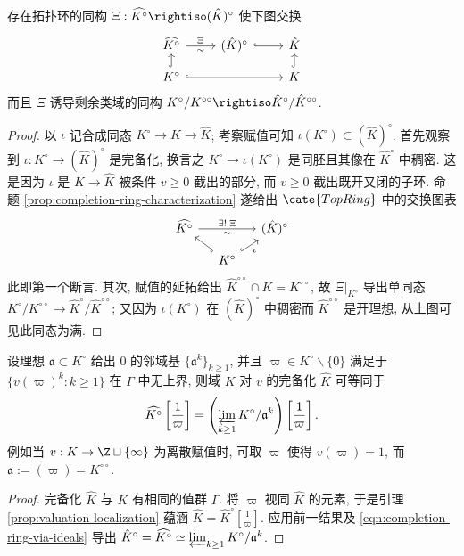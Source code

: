 \begin{proposition}\label{prop:K-circ-completion}
	存在拓扑环的同构 $\Xi: \widehat{K^\circ} \rightiso (\hat{K})^\circ$ 使下图交换
	\[ \begin{tikzcd}[row sep=small]
		\widehat{K^\circ} \arrow[r, "\Xi", "\sim"'] & (\hat{K})^\circ \arrow[hookrightarrow, r] & \hat{K} \\
		K^\circ \arrow[hookrightarrow, u] \arrow[hookrightarrow, rr] & & K \arrow[hookrightarrow, u]
	\end{tikzcd}\]
	而且 $\Xi$ 诱导剩余类域的同构 $K^\circ/K^{\circ\circ} \rightiso \hat{K}^\circ/\hat{K}^{\circ\circ}$.
\end{proposition}
\begin{proof}
	以 $\iota$ 记合成同态 $K^\circ \to K \to \hat{K}$; 考察赋值可知 $\iota(K^\circ) \subset (\hat{K})^\circ$. 首先观察到 $\iota: K^\circ \to (\hat{K})^\circ$ 是完备化, 换言之 $K^\circ \to \iota(K^\circ)$ 是同胚且其像在 $\hat{K}^\circ$ 中稠密. 这是因为 $\iota$ 是 $K \to \hat{K}$ 被条件 $v \geq 0$ 截出的部分, 而 $v \geq 0$ 截出既开又闭的子环. 命题 \ref{prop:completion-ring-characterization} 遂给出 $\cate{TopRing}$ 中的交换图表
	\[\begin{tikzcd}[column sep=small, row sep=small]
		\widehat{K^\circ} \arrow[rr, "{\exists!\; \Xi}", "\sim"'] & & (\hat{K})^\circ \\
		& K^\circ \arrow[hookrightarrow, lu] \arrow[hookrightarrow, ru, "\iota"'] &
	\end{tikzcd}\]
	此即第一个断言. 其次, 赋值的延拓给出 $\hat{K}^{\circ\circ} \cap K = K^{\circ\circ}$, 故 $\Xi|_{K^\circ}$ 导出单同态 $K^\circ/K^{\circ\circ} \to \hat{K}^\circ/\hat{K}^{\circ\circ}$; 又因为 $\iota(K^\circ)$ 在 $(\hat{K})^\circ$ 中稠密而 $\hat{K}^{\circ\circ}$ 是开理想, 从上图可见此同态为满.
\end{proof}

\begin{proposition}\label{prop:invert-pi}
	设理想 $\mathfrak{a} \subset K^\circ$ 给出 $0$ 的邻域基 $\{ \mathfrak{a}^k \}_{k \geq 1}$, 并且 $\varpi \in K^\circ \smallsetminus \{0\}$ 满足于 $\{v(\varpi)^k : k \geq 1\}$ 在 $\Gamma$ 中无上界, 则域 $K$ 对 $v$ 的完备化 $\hat{K}$ 可等同于
	\[ \widehat{K^\circ}\left[\frac{1}{\varpi} \right] = \left( \varprojlim_{k \geq 1} K^\circ/\mathfrak{a}^k \right)\left[ \frac{1}{\varpi} \right]. \]
	例如当 $v: K \to \Z \sqcup \{\infty\}$ 为离散赋值时, 可取 $\varpi$ 使得 $v(\varpi)=1$, 而 $\mathfrak{a} := (\varpi) = K^{\circ\circ}$.
\end{proposition}
\begin{proof}
	完备化 $\hat{K}$ 与 $K$ 有相同的值群 $\Gamma$. 将 $\varpi$ 视同 $\hat{K}$ 的元素, 于是引理 \ref{prop:valuation-localization} 蕴涵 $\hat{K} = \hat{K}^\circ[\frac{1}{\varpi}]$. 应用前一结果及 \eqref{eqn:completion-ring-via-ideals} 导出 $\hat{K}^\circ = \widehat{K^\circ} \simeq \varprojlim_{k \geq 1} K^\circ/\mathfrak{a}^k$.
\end{proof}

